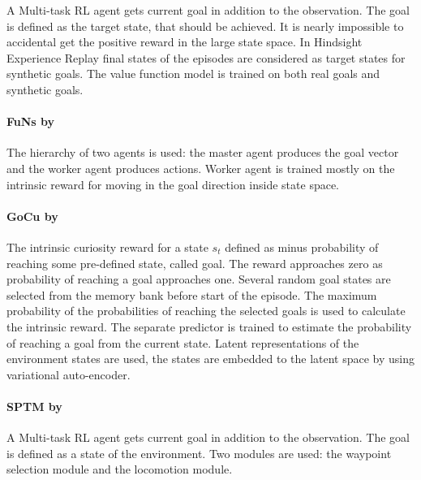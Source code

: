 \documentclass[acmsmall, nonacm]{acmart}
\begin{document}
A Multi-task RL agent gets current goal in addition to the observation. The goal is defined as the target state, that should be achieved. It is nearly impossible to accidental get the positive reward in the large state space. In Hindsight Experience Replay final states of the episodes are considered as target states for synthetic goals. The value function model is trained on both real goals and synthetic goals.


\paragraph{FuNs by~\citet{Vezhnevets2017FeUdalNF}} %
\label{par:funs}

The hierarchy of two agents is used: the master agent produces the goal vector and the worker agent produces actions. Worker agent is trained mostly on the intrinsic reward for moving in the goal direction inside state space.


\paragraph{GoCu by~\citet{Bougie2019SkillbasedCF}} %
\label{par:gocu}

The intrinsic curiosity reward for a state $s_t$ defined as minus probability of reaching some pre-defined state, called goal. The reward approaches zero as probability of reaching a goal approaches one. Several random goal states are selected from the memory bank before start of the episode. The maximum probability of the probabilities of reaching the selected goals is used to calculate the intrinsic reward. The separate predictor is trained to estimate the probability of reaching a goal from the current state. Latent representations of the environment states are used, the states are embedded to the latent space by using variational auto-encoder.


\paragraph{SPTM by~\citet{savinov2018semiparametric}} %
\label{par:sptm}

A Multi-task RL agent gets current goal in addition to the observation. The goal is defined as a state of the environment. Two modules are used: the waypoint selection module and the locomotion module.
\end{document}
